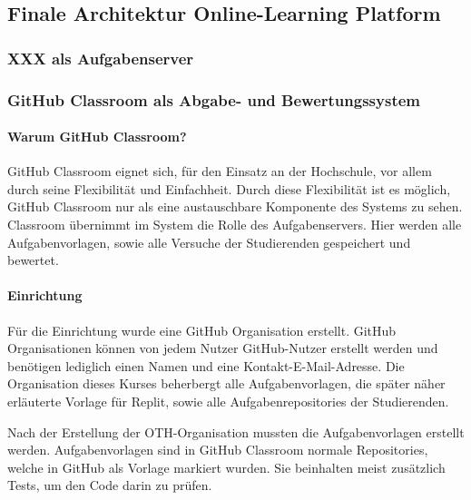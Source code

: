 \subsection{Finale Architektur Online-Learning Platform}
\subsubsection{XXX als Aufgabenserver}
\subsubsection{GitHub Classroom als Abgabe- und Bewertungssystem}
\paragraph{Warum GitHub Classroom?}
GitHub Classroom eignet sich, für den Einsatz an der Hochschule, vor allem durch
seine Flexibilität und Einfachheit. Durch diese Flexibilität ist es möglich,
GitHub Classroom nur als eine austauschbare Komponente des Systems zu sehen.
Classroom übernimmt im System die Rolle des Aufgabenservers. Hier werden alle
Aufgabenvorlagen, sowie alle Versuche der Studierenden gespeichert und bewertet.

\paragraph{Einrichtung}
Für die Einrichtung wurde eine GitHub Organisation erstellt. GitHub
Organisationen können von jedem Nutzer GitHub-Nutzer erstellt werden und
benötigen lediglich einen Namen und eine Kontakt-E-Mail-Adresse. Die
Organisation dieses Kurses beherbergt alle Aufgabenvorlagen, die später näher
erläuterte Vorlage für Replit, sowie alle Aufgabenrepositories der Studierenden.

Nach der Erstellung der OTH-Organisation mussten die Aufgabenvorlagen erstellt
werden. Aufgabenvorlagen sind in GitHub Classroom normale Repositories, welche
in GitHub als Vorlage markiert wurden. Sie beinhalten meist zusätzlich Tests, um
den Code darin zu prüfen.

